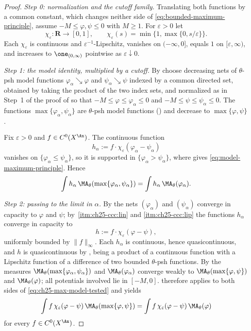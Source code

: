 \begin{proof}
\emph{Step 0: normalization and the cutoff family.}  Translating both
functions by a common constant, which changes neither side of
\eqref{eq:bounded-maximum-principle}, assume $-M\leq\varphi,\psi\leq0$ with
$M\geq1$.  For $\varepsilon>0$ let
\[
 \chi_\varepsilon:\mathbf R\to[0,1],\qquad
 \chi_\varepsilon(s)=\min\{1,\max\{0,s/\varepsilon\}\} .
\]
Each $\chi_\varepsilon$ is continuous and $\varepsilon^{-1}$-Lipschitz,
vanishes on $(-\infty,0]$, equals $1$ on $[\varepsilon,\infty)$, and
increases to $\one_{(0,\infty)}$ pointwise as
$\varepsilon\downarrow0$.

\emph{Step 1: the model identity, multiplied by a cutoff.}  By
 choose decreasing nets of
$\theta$-psh model functions $\varphi_\alpha\searrow\varphi$ and
$\psi_\alpha\searrow\psi$ indexed by a common directed set, obtained by
taking the product of the two index sets, and normalized as in Step~1 of the
proof of  so that
$-M\leq\varphi\leq\varphi_\alpha\leq0$ and
$-M\leq\psi\leq\psi_\alpha\leq0$.  The functions
$\max\{\varphi_\alpha,\psi_\alpha\}$ are $\theta$-psh model functions
() and decrease to $\max\{\varphi,\psi\}$.

Fix $\varepsilon>0$ and $f\in C^0(X^{\An})$.  The continuous function
\[
 h_\alpha:=f\cdot\chi_\varepsilon(\varphi_\alpha-\psi_\alpha)
\]
vanishes on $\{\varphi_\alpha\leq\psi_\alpha\}$, so it is supported in
$\{\varphi_\alpha>\psi_\alpha\}$, where
 gives
\eqref{eq:model-maximum-principle}.  Hence
\begin{equation}
\label{eq:ch25-max-model-tested}
 \int h_\alpha\,\MA_\theta(\max\{\varphi_\alpha,\psi_\alpha\})
 =\int h_\alpha\,\MA_\theta(\varphi_\alpha) .
\end{equation}

\emph{Step 2: passing to the limit in $\alpha$.}  By
 the nets
$(\varphi_\alpha)$ and $(\psi_\alpha)$ converge in capacity to
$\varphi$ and $\psi$; by
\,\cref{itm:ch25-ccc:lin} and
\cref{itm:ch25-ccc:lip} the functions
$h_\alpha$ converge in capacity to
\[
 h:=f\cdot\chi_\varepsilon(\varphi-\psi),
\]
uniformly bounded by $\|f\|_\infty$.  Each $h_\alpha$ is continuous,
hence quasicontinuous, and $h$ is quasicontinuous by
, being a product of a continuous
function with a Lipschitz function of a difference of two bounded
$\theta$-psh functions.  By  the measures
$\MA_\theta(\max\{\varphi_\alpha,\psi_\alpha\})$ and
$\MA_\theta(\varphi_\alpha)$ converge weakly to
$\MA_\theta(\max\{\varphi,\psi\})$ and $\MA_\theta(\varphi)$; all
potentials involved lie in $[-M,0]$.   therefore
applies to both sides of \eqref{eq:ch25-max-model-tested} and yields
\begin{equation}
\label{eq:ch25-max-limit-tested}
 \int f\,\chi_\varepsilon(\varphi-\psi)\,
   \MA_\theta(\max\{\varphi,\psi\})
 =\int f\,\chi_\varepsilon(\varphi-\psi)\,\MA_\theta(\varphi)
\end{equation}
for every $f\in C^0(X^{\An})$.


\end{proof}
